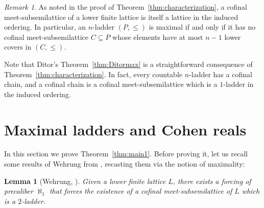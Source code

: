 \documentclass[]{amsart}
\newtheorem{lemma}[theorem]{Lemma}
\theoremstyle{definition}
\theoremstyle{remark}
\newtheorem{remark}[theorem]{Remark}
\begin{document}
\begin{remark}\label{rmk:cofinalmeet}
As noted in the proof of Theorem~\ref{thm:characterization}, a cofinal meet-subsemilattice of a lower finite lattice is itself a lattice in the induced ordering. In particular, an $n$-ladder $(P, \le) $ is maximal if and only if it has no cofinal meet-subsemilattice $C \subseteq P$ whose elements have at most $n-1$ lower covers in $(C, \le)$.
\end{remark}

Note that Ditor's Theorem~\ref{thm:Ditormax} is a straightforward consequence of Theorem~\ref{thm:characterization}. In fact, every countable $n$-ladder has a cofinal chain, and a cofinal chain is a cofinal meet-subsemilattice which is a $1$-ladder in the induced ordering.


\section{Maximal ladders and Cohen reals}\label{sec:cohen}

In this section we prove Theorem~\ref{thm:main1}. Before proving it, let us recall some results of Wehrung from \cite{MR2609217}, recasting them via the notion of maximality:


\begin{lemma}[{Wehrung, \cite[Lemma 7.5]{MR2609217}}]\label{prop:orwehrung}
Given a lower finite lattice $L$, there exists a forcing of precaliber $\aleph_1$ that forces the existence of a cofinal meet-subsemilattice of $L$ which is a $2$-ladder.
\end{lemma}
\end{document}
